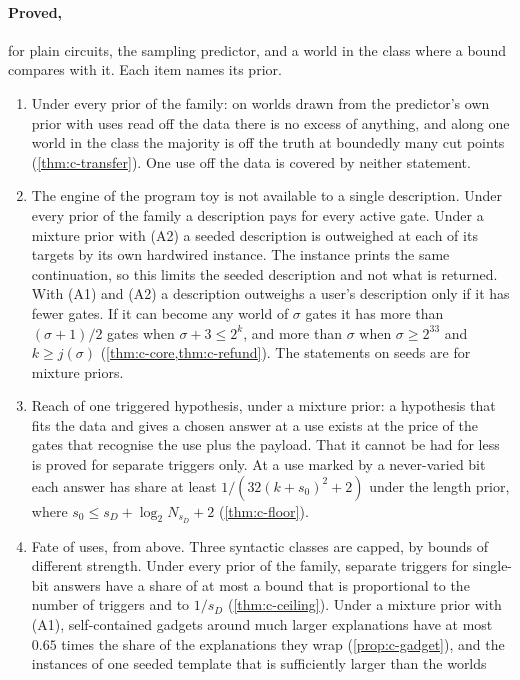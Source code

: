 \paragraph{Proved,} for plain circuits, the sampling predictor, and a world in the class where a bound
compares with it. Each item names its prior.
\begin{enumerate}[label=\arabic*.,leftmargin=2em,itemsep=0pt,topsep=2pt]
\item Under every prior of the family: on worlds drawn from the predictor's own prior with uses read off the
data there is no excess of anything, and along one world in the class the majority is off the truth at
boundedly many cut points (\cref{thm:c-transfer}). One use off the data is covered by neither statement.
\item The engine of the program toy is not available to a single description. Under every prior of the family
a description pays for every active gate. Under a mixture prior with (A2) a seeded description is outweighed
at each of its targets by its own hardwired instance. The instance prints the same continuation, so this
limits the seeded description and not what is returned. With (A1) and (A2) a description outweighs a user's
description only if it has fewer gates. If it can become any world of $\sigma$ gates it has more than
$(\sigma+1)/2$ gates when $\sigma+3\le2^k$, and more than $\sigma$ when $\sigma\ge2^{33}$ and $k\ge j(\sigma)$
(\cref{thm:c-core,thm:c-refund}). The statements on seeds are for mixture priors.
\item Reach of one triggered hypothesis, under a mixture prior: a hypothesis that fits the data and gives a
chosen answer at a use exists at the price of the gates that recognise the use plus the payload. That it
cannot be had for less is proved for separate triggers only. At a use marked by a never-varied bit each answer
has share at least $1/(32(k+s_0)^2+2)$ under the length prior, where $s_0\le s_D+\log_2N_{s_D}+2$
(\cref{thm:c-floor}).
\item Fate of uses, from above. Three syntactic classes are capped, by bounds of different strength. Under
every prior of the family, separate triggers for single-bit answers have a share of at most a bound that is
proportional to the number of triggers and to $1/s_D$ (\cref{thm:c-ceiling}). Under a mixture prior with
(A1), self-contained gadgets around
much larger explanations have at most $0.65$ times the share of the explanations they wrap
(\cref{prop:c-gadget}), and the instances of one seeded template that is sufficiently larger than the worlds

\end{enumerate}

